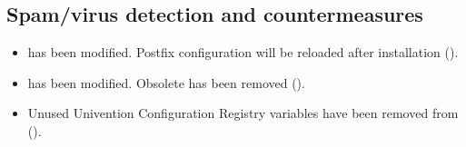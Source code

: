 \subsection{Spam/virus detection and countermeasures}
\begin{itemize}

\item {} has been modified. Postfix
configuration will be reloaded after installation ().

\item {} has been modified. Obsolete
 has been removed ().

\item Unused Univention Configuration Registry variables have been removed
from  ().

\end{itemize}


